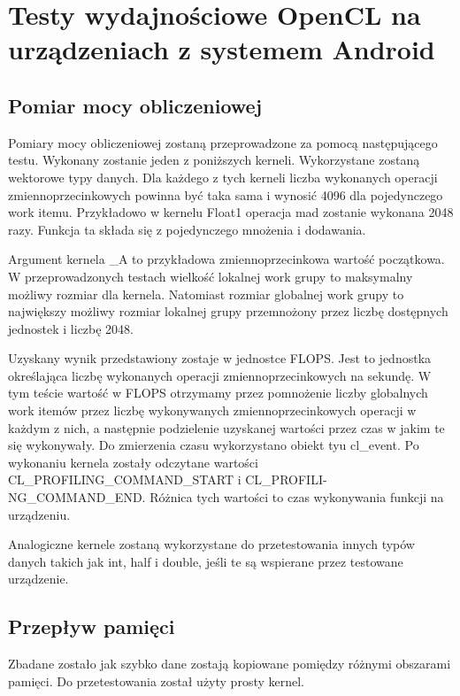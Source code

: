 \section[Testy wydajnościowe OpenCL na urządzeniach z systemem Android]{Testy wydajnościowe OpenCL na urządzeniach z systemem Android}

\subsection[Pomiar mocy obliczeniowej]{Pomiar mocy obliczeniowej}
Pomiary mocy obliczeniowej zostaną przeprowadzone za pomocą następującego testu.
Wykonany zostanie jeden z poniższych kerneli. Wykorzystane zostaną wektorowe typy danych. Dla każdego z tych kerneli liczba wykonanych operacji zmiennoprzecinkowych powinna być taka sama i wynosić 4096 dla pojedynczego work itemu. Przykładowo w kernelu Float1 operacja mad zostanie wykonana 2048 razy. Funkcja ta składa się z pojedynczego mnożenia i dodawania.

Argument kernela \_A to przykładowa zmiennoprzecinkowa wartość początkowa. W przeprowadzonych testach wielkość lokalnej work grupy to maksymalny możliwy rozmiar dla kernela. Natomiast rozmiar globalnej work grupy to największy możliwy rozmiar lokalnej grupy przemnożony przez liczbę dostępnych jednostek i liczbę 2048.

Uzyskany wynik przedstawiony zostaje w jednostce FLOPS. Jest to jednostka określająca liczbę wykonanych operacji zmiennoprzecinkowych na sekundę. W tym teście wartość w FLOPS otrzymamy przez pomnożenie liczby globalnych work itemów przez liczbę wykonywanych zmiennoprzecinkowych operacji w każdym z nich, a następnie podzielenie uzyskanej wartości przez czas w jakim te się wykonywały. Do zmierzenia czasu wykorzystano obiekt tyu cl\_event. Po wykonaniu kernela zostały odczytane wartości CL\_PROFILING\_COMMAND\_START i CL\_PROFILI- NG\_COMMAND\_END. Różnica tych wartości to czas wykonywania funkcji na urządzeniu.

Analogiczne kernele zostaną wykorzystane do przetestowania innych typów danych takich jak int, half i double, jeśli te są wspierane przez testowane urządzenie.

\subsection[Przepływ pamięci]{Przepływ pamięci}
Zbadane zostało jak szybko dane zostają kopiowane pomiędzy różnymi obszarami pamięci. Do przetestowania został użyty prosty kernel.

